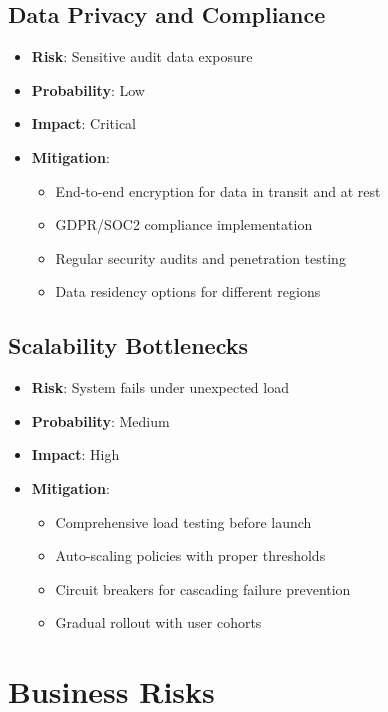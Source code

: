 \documentclass[12pt,a4paper]{report}
\begin{document}
\subsection{Data Privacy and Compliance}
\begin{itemize}
    \item \textbf{Risk}: Sensitive audit data exposure
    \item \textbf{Probability}: Low
    \item \textbf{Impact}: Critical
    \item \textbf{Mitigation}:
    \begin{itemize}
        \item End-to-end encryption for data in transit and at rest
        \item GDPR/SOC2 compliance implementation
        \item Regular security audits and penetration testing
        \item Data residency options for different regions
    \end{itemize}
\end{itemize}

\subsection{Scalability Bottlenecks}
\begin{itemize}
    \item \textbf{Risk}: System fails under unexpected load
    \item \textbf{Probability}: Medium
    \item \textbf{Impact}: High
    \item \textbf{Mitigation}:
    \begin{itemize}
        \item Comprehensive load testing before launch
        \item Auto-scaling policies with proper thresholds
        \item Circuit breakers for cascading failure prevention
        \item Gradual rollout with user cohorts
    \end{itemize}
\end{itemize}

\section{Business Risks}
\end{document}
